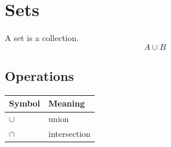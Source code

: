\chapter{Sets}
A set is a collection.
$$A \cup B$$
\section{Operations}
\begin{tabular}{ll}
\toprule
Symbol & Meaning \\
\midrule
$\cup$ & union \\
$\cap$ & intersection \\
\bottomrule
\end{tabular}
